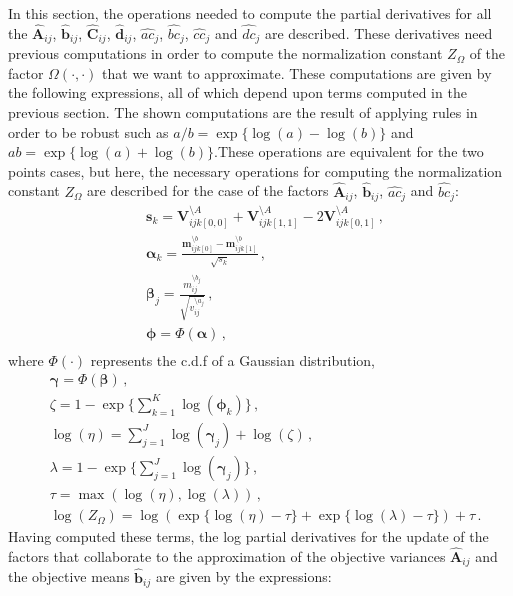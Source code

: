 In this section, the operations needed to compute the partial derivatives for all the $\hat{\boldsymbol{A}}_{ij}$, $\hat{\boldsymbol{b}}_{ij}$, $\hat{\boldsymbol{C}}_{ij}$, $\hat{\boldsymbol{d}}_{ij}$, $\hat{ac}_j$, $\hat{bc}_j$, $\hat{cc}_j$ and $\hat{dc}_j$ are described. These derivatives need previous computations in order to compute the normalization constant $Z_\Omega$ of the factor $\Omega(\cdot,\cdot)$ that we want to approximate. These computations are given by the following expressions, all of which depend upon terms computed in the previous section. The shown computations are the result of applying rules in order to be robust such as $a/b = \exp\{\log(a)-\log(b)\}$ and $ab = \exp\{\log(a)+\log(b)\}$.These operations are equivalent for the two points cases, but here, the necessary operations for computing the normalization constant $Z_\Omega$ are described for the case of the factors $\hat{\boldsymbol{A}}_{ij}$, $\hat{\boldsymbol{b}}_{ij}$, $\hat{ac}_j$ and $\hat{bc}_j$:
\begin{align}
    & \boldsymbol{s}_k = \boldsymbol{V}_{ijk[0,0]}^{\setminus A} + \boldsymbol{V}_{ijk[1,1]}^{\setminus A} - 2\boldsymbol{V}_{ijk[0,1]}^{\setminus A}\,, \\
    & \boldsymbol{\alpha}_k = \frac{\boldsymbol{m}_{ijk[0]}^{\setminus b}-\boldsymbol{m}_{ijk[1]}^{\setminus b}}{\sqrt{s_k}}\,, \\
    & \boldsymbol{\beta}_j = \frac{m_{ij}^{\setminus b_j}}{\sqrt{v_{ij}^{\setminus a_j}}}\,, \\
    & \boldsymbol{\phi} = \Phi(\boldsymbol{\alpha})\,, \\
\end{align}
where $\Phi(\cdot)$ represents the c.d.f of a Gaussian distribution,
\begin{align}
    & \boldsymbol{\gamma} = \Phi(\boldsymbol{\beta})\,, \\
    & \zeta = 1-\exp\{\sum_{k=1}^{K} \log(\boldsymbol{\phi}_k)\}\,, \\
    & \log(\eta) = \sum_{j=1}^{J}\log(\boldsymbol{\gamma}_j) + \log(\zeta)\,, \\
    & \lambda = 1-\exp\{\sum_{j=1}^{J}\log(\boldsymbol{\gamma}_j)\}\,, \\
    & \tau = \max(\log(\eta),\log(\lambda))\,, \\
    & \log(Z_\Omega) = \log(\exp\{\log(\eta) - \tau\} + \exp\{\log(\lambda) - \tau\}) + \tau\,.
\end{align}
Having computed these terms, the log partial derivatives for the update of the factors that collaborate to the approximation of the objective variances $\hat{\boldsymbol{A}}_{ij}$ and the objective means $\hat{\boldsymbol{b}}_{ij}$ are given by the expressions:
